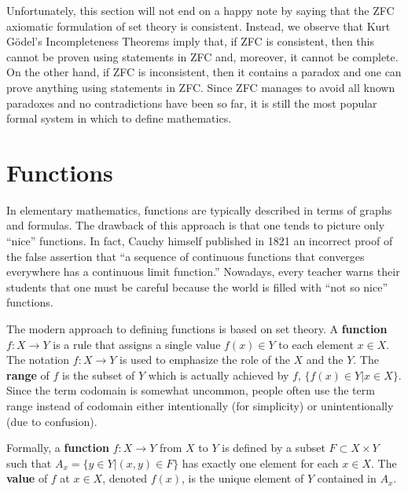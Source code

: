 Unfortunately, this section will not end on a happy note by saying that the ZFC axiomatic formulation of set theory is consistent.
Instead, we observe that Kurt G\"{o}del's Incompleteness Theorems imply that, if ZFC is consistent, then this cannot be proven using statements in ZFC and, moreover, it cannot be complete.
On the other hand, if ZFC is inconsistent, then it contains a paradox and one can prove anything using statements in ZFC.
Since ZFC manages to avoid all known paradoxes and no contradictions have been so far, it is still the most popular formal system in which to define mathematics.


\section{Functions}

In elementary mathematics, functions are typically described in terms of graphs and formulas.
The drawback of this approach is that one tends to picture only ``nice'' functions.
In fact, Cauchy himself published in 1821 an incorrect proof of the false assertion that ``a sequence of continuous functions that converges everywhere has a continuous limit function.''
Nowadays, every teacher warns their students that one must be careful because the world is filled with ``not so nice'' functions.

The modern approach to defining functions is based on set theory.
A \textbf{function} $f \colon X\rightarrow Y$ is a rule that assigns a single value $f(x)\in Y$ to each element $x\in X$.
The notation $f \colon X \rightarrow Y$ is used to emphasize the role of the  $X$ and the  $Y$.
The \textbf{range} of $f$ is the subset of $Y$ which is actually achieved by $f$, $\{f(x) \in Y | x\in X \}$.
Since the term codomain is somewhat uncommon, people often use the term range instead of codomain either intentionally (for simplicity) or unintentionally (due to confusion).
\begin{definition}
Formally, a \textbf{function} $f \colon X \rightarrow Y$ from $X$ to $Y$ is defined by a subset $F \subset X \times Y$ such that $A_x = \{ y\in Y | (x,y)\in F \}$ has exactly one element for each $x\in X$.
The \textbf{value} of $f$ at $x\in X$, denoted $f(x)$, is the unique element of $Y$ contained in $A_x$.
\end{definition}

